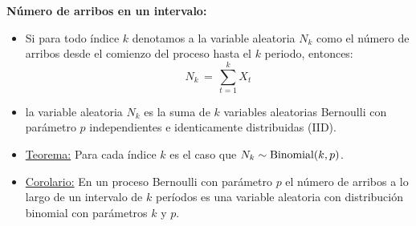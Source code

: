 \documentclass[ 10pt, xcolor = dvipsnames]{beamer}
\begin{document}
\begin{frame}[allowframebreaks]
\frametitle{\insertsection}

\textbf{N\'umero de arribos en un intervalo:}
\begin{itemize}
\item Si para todo \'indice $k$ denotamos a la variable aleatoria $N_k$ como el n\'umero \linebreak de arribos desde el comienzo del proceso hasta el $k$ periodo, entonces: 
\[
N_k \, = \, \sum_{t=1}^k X_t
\]
\item \Ie la variable aleatoria $N_k$ es la suma de $k$ variables aleatorias Bernoulli con par\'ametro $p$ independientes e identicamente distribuidas (IID). 
\item \underline{Teorema:} Para cada \'indice $k$ es el caso que $N_k \sim \text{Binomial}(k,p)$. 
\item \underline{Corolario:} En un proceso Bernoulli con par\'ametro $p$ el n\'umero de arribos \linebreak a lo largo de un intervalo de $k$ per\'iodos es una variable aleatoria con distribuci\'on binomial con par\'ametros $k$ y $p$. 
\end{itemize}

\end{frame}
\end{document}
